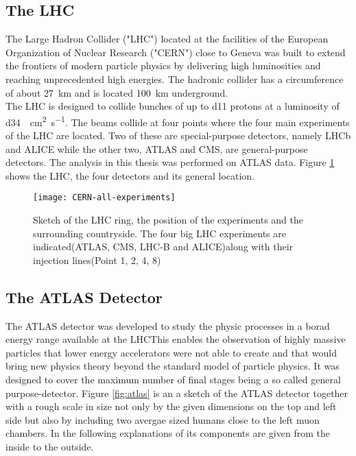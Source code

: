 \subsection{The LHC}

The Large Hadron Collider ("LHC") located at the facilities of the European Organization of Nuclear Research ("CERN") close to Geneva was built to extend the frontiers of modern particle physics by delivering high luminosities and reaching unprecedented high energies. The hadronic collider has a circumference of about \SI{27}{\km} and is located \SI{100}{\km} underground.\\
The LHC is designed to collide bunches of up to \num{d11} protons at a luminosity of \SI{d34}{\per\square\cm \per\s}. The beams collide at four points where the four main experiments of the LHC are located. Two of these are special-purpose detectors, namely LHCb and ALICE while the other two, ATLAS and CMS, are general-purpose detectors.
The analysis in this thesis was performed on ATLAS data.
Figure \ref{fig:LHC} shows the LHC, the four detectors and its general location.
\begin{figure}[h]
  \centering
  \texttt{[image: CERN-all-experiments]}
  \caption[Sketch of the LHC ring, the position of the experiments and
  the surrounding countryside.]{Sketch of the LHC ring, the position
    of the experiments and the surrounding countryside. The four big
    LHC experiments are indicated(ATLAS, CMS, LHC-B and ALICE)along with their injection lines(Point 1, 2, 4, 8)\cite{atlasfigures}}
  \label{fig:LHC}
\end{figure}


\subsection{The ATLAS Detector}

The ATLAS detector was developed to study the physic processes in a borad energy range available at the LHCThis enables the observation of highly massive particles that lower energy accelerators were not able to create and that would bring new physics theory beyond the standard model of particle physics.
It was designed to cover the maximum number of final stages being a so called general purpose-detector.
Figure \ref{fig:atlas} is an a sketch of the ATLAS detector together with a rough scale in size not only by the given dimensions on the top and left side but also by including two avergae sized humans close to the left muon chambers. In the following explanations of its components are given from the inside to the outside.

